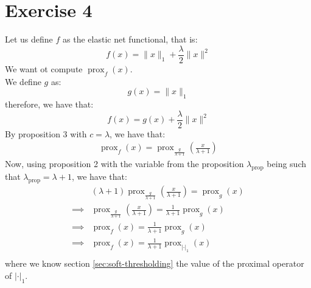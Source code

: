 \documentclass[12pt]{article}
\newcommand{\prox}{\operatorname{prox}}
\begin{document}
\section{Exercise 4}
Let us define $f$ as the elastic net functional, that is:
\begin{equation*}
  f(x) = \|x\|_1 + \frac{\lambda}{2}\|x\|^2
\end{equation*}
We want ot compute $\prox_{f}(x)$. \\
We define $g$ as:
\begin{equation*}
  g(x) = \| x \|_1
\end{equation*}
therefore, we have that:
\begin{equation*}
  f(x) = g(x) + \frac{\lambda}{2}\|x\|^2
\end{equation*}
By proposition 3 with $c = \lambda$, we have that:
\begin{align*}
  \prox_{f}(x) = \prox_{\frac{g}{\lambda + 1}} \left( \frac{x}{\lambda + 1}\right)
\end{align*}
Now, using proposition 2 with the variable from the proposition $\lambda_{\text{prop}}$ being such that $\lambda_{\text{prop}} = \lambda + 1$, we have that:
\begin{align*}
           &
  (\lambda + 1) \prox_{\frac{g}{\lambda + 1}} \left( \frac{x}{\lambda + 1}\right) = \prox_{g} \left( x \right)         \\
  \implies &
  \prox_{\frac{g}{\lambda + 1}} \left( \frac{x}{\lambda + 1}\right) = \frac{1}{\lambda + 1} \prox_{g} \left( x \right) \\
  \implies &
  \prox_{f} \left( x \right) = \frac{1}{\lambda + 1} \prox_{g} \left( x \right)                                        \\
  \implies &
  \prox_{f} \left( x \right) = \frac{1}{\lambda + 1} \prox_{| \cdot |_1} \left( x \right)                              \\
\end{align*}
where we know section \ref{sec:soft-thresholding} the value of the proximal operator of $| \cdot |_1$.


\end{document}
